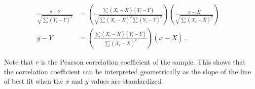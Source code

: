 \documentclass{article}
\begin{document}
\begin{align*}
\frac{y - \overline{Y}}{\sqrt{\sum (Y_i - \overline{Y})^2}}
&= \left(
     \frac{\sum (X_i - \overline{X}) (Y_i - \overline{Y})}
          {\sqrt{\sum (X_i - \overline{X})^2 \sum (Y_i - \overline{Y})^2}}
   \right)
   \left(
     \frac{x - \overline{X}}
          {\sqrt{\sum (X_i - \overline{X})^2}}
   \right)\\
y - \overline{Y} &=
\left(
     \frac{\sum (X_i - \overline{X}) (Y_i - \overline{Y})}
          {\sum (X_i - \overline{X})^2}
   \right)
   (x - \overline{X})\ .
\end{align*}

Note that $r$ is the Pearson correlation coefficient of the sample.
This shows that the correlation coefficient can be interpreted geometrically
as the slope of the line of best fit when the $x$ and $y$ values are standardized.
\fi
\end{document}
